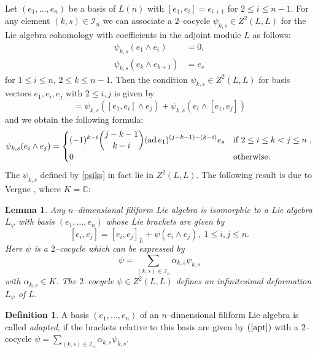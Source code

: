 \documentclass[12pt]{amsart}
\newtheorem{lem}[thm]{Lemma}
\theoremstyle{definition}
\newtheorem{defi}[thm]{Definition}
\theoremstyle{remark}
\newcommand{\C}{\mathbb{C}}
\newcommand{\ad}{\mathop{\rm ad}}
\newcommand{\CI}{\mathcal{I}}
\newcommand{\al}{\alpha}
\begin{document}
Let $(e_1,\ldots , e_n)$ be a basis of $L(n)$ with $[e_1,e_{i}]=e_{i+1}$
for $2\le i\le n-1$.
For any element $(k,s)\in \CI_n$ we can associate a $2$--cocycle
$\psi_{k,s}\in Z^2(L,L)$ for the Lie algebra cohomology with
coefficients in the adjoint module $L$ as follows:
\begin{align*}
\psi_{k,s}(e_1\wedge e_i) & = 0,\\
\psi_{k,s}(e_k\wedge e_{k+1}) & = e_s
\end{align*}
for $1\le i\le n,\,  2\le k\le n-1$.
Then the condition $\psi_{k,s}\in Z^2(L,L)$ for basis vectors
$e_1,e_i,e_j$ with $2\le i,j$ is given by
\begin{equation*}
[e_1, \psi_{k,s}(e_i\wedge e_j)] = \psi_{k,s}([e_1,e_{i}]\wedge e_j)+
\psi_{k,s}(e_i \wedge [e_1,e_{j}])
\end{equation*}
and we obtain the following formula:
\begin{equation}\label{psiks}
\psi_{k,s}(e_i\wedge e_j) =\begin{cases}
\displaystyle{(-1)^{k-i} \binom{j-k-1}{k-i}(\ad e_1)^{(j-k-1)-(k-i)}e_s} &
\text{if $2\le i\le k<j\le n$ },\\[0.2cm]
\displaystyle{0} & \text{otherwise}.
\end{cases}
\end{equation}
The $\psi_{k,s}$ defined by \eqref{psiks} in fact lie
in $Z^2(L,L)$. The following result is due to Vergne \cite{V}, where
$K=\C$:
\begin{lem}\label{vergne}
Any $n$--dimensional filiform Lie algebra is isomorphic to a
Lie algebra $L_{\psi}$ with basis $(e_1,\ldots , e_n)$ whose Lie brackets
are given by
\begin{equation}\label{apt}
[e_i,e_j]=[e_i,e_j]_L + \psi (e_i\wedge e_j),\; 1\le i,j \le n.
\end{equation}
Here $\psi$ is a $2$--cocycle which can be expressed by
\begin{equation*}
\psi=\sum_{(k,s)\in \CI_n}\al_{k,s} \psi_{k,s}
\end{equation*}
with $\al_{k,s}\in K$. The $2$--cocycle $\psi\in Z^2(L,L)$ defines an
infinitesimal deformation $L_{\psi}$ of $L$.
\end{lem}

\begin{defi}
A basis $(e_1,\ldots ,e_n)$ of an $n$--dimensional filiform Lie algebra
is called {\it adapted}, if the brackets relative to this basis are given
by $(\ref{apt})$ with a $2$--cocycle
$\psi=\sum_{(k,s)\in \CI_n}\al_{k,s} \psi_{k,s}$.
\end{defi}
\end{document}
